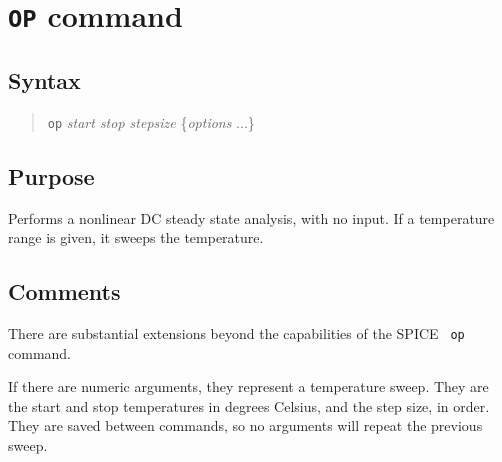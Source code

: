%
%
%
%
\section{{\tt OP} command}
\subsection{Syntax}
\begin{verse}
{\tt op} {\it start stop stepsize} \{{\it options} ...\}
\end{verse}
\subsection{Purpose}

Performs a nonlinear DC steady state analysis, with no input.  If a
temperature range is given, it sweeps the temperature.
\subsection{Comments}

There are substantial extensions beyond the capabilities of the SPICE {\tt
op} command.

If there are numeric arguments, they represent a temperature sweep.  They are
the start and stop temperatures in degrees Celsius, and the step size, in
order.  They are saved between commands, so no arguments will repeat the
previous sweep.

